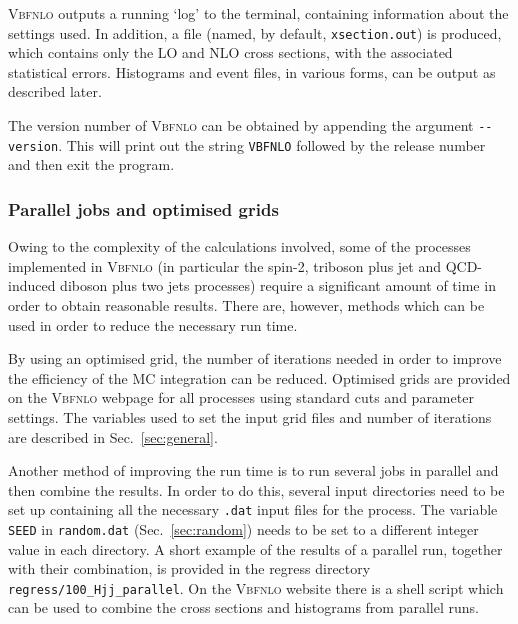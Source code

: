 \documentclass[english,12pt]{article}
\begin{document}
\textsc{Vbfnlo} outputs a running `log' to the terminal, containing information
about the settings used.  In addition, a file (named, by default, {\tt xsection.out}) is produced,
which contains only the LO and NLO cross sections, with the associated statistical errors. 
Histograms and event files, in various forms, can be output as described later.

\noindent The version number of \textsc{Vbfnlo} can be obtained by appending the
argument {\tt -{}-version}. This will print out the string {\tt VBFNLO}
followed by the release number and then exit the program.


\subsubsection{Parallel jobs and optimised grids}
Owing to the complexity of the calculations involved, some of the processes
implemented in \textsc{Vbfnlo} (in particular the spin-2, triboson
plus jet and QCD-induced diboson plus two jets processes) 
require a significant amount of time in order to obtain
reasonable results.  There are, however, methods which can be used in order to
reduce the necessary run time.

By using an optimised grid, the number of iterations needed in order to improve
the efficiency of the MC integration can be reduced.  Optimised grids are
provided on the \textsc{Vbfnlo} webpage for all processes using standard cuts
and parameter settings.  The variables used to set the input grid files and
number of iterations are described in Sec.~\ref{sec:general}.

Another method of improving the run time is to run several jobs in parallel and
then combine the results.  In order to do this, several input directories need to
be set up containing all the necessary {\tt .dat} input files for the process. 
The variable {\tt SEED} in {\tt random.dat} (Sec.~\ref{sec:random}) needs to be
set to a different integer value in each directory.  A short example of the
results of a parallel run, together with their combination, is provided in the
regress directory {\tt regress/100\_Hjj\_parallel}.  On the \textsc{Vbfnlo}
website there is a shell script which can be used to combine the cross sections
and histograms from parallel runs.

\end{document}
